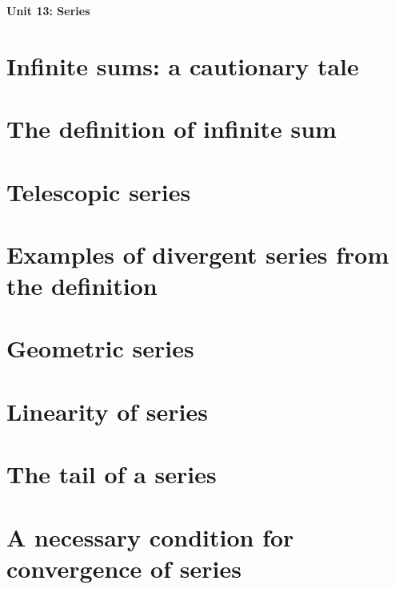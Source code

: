 

\usepackage{blindtext}

\usepackage{pgfplots}
\usepackage{subfiles}

\sectionfont{\color{blue}\selectfont}
\subsectionfont{\color{green}\selectfont}


\newtheorem{theorem}{Theorem}[section]
\newtheorem*{theorem*}{Theorem}
\newtheorem{definition}{Definition}[section]
{\LARGE \textbf{Unit 13: Series}}
\thispagestyle{empty}
\tableofcontents
\newpage
\clearpage
\setcounter{page}{1}
\section{Infinite sums: a cautionary tale}


\section{The definition of infinite sum}


\section{Telescopic series}


\section{Examples of divergent series from the definition}


\section{Geometric series}


\section{Linearity of series}


\section{The tail of a series}


\section{A necessary condition for convergence of series}



